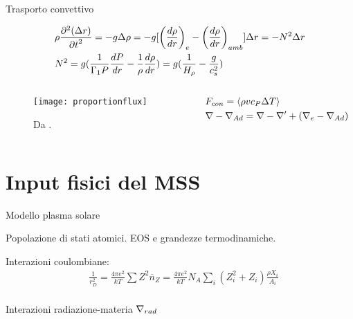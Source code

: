 \documentclass[10pt,xcolor={usenames},fleqn,mathserif,serif]{beamer}
\begin{document}
\begin{frame}{Trasporto convettivo}

\begin{align*}
&\rho\PtwoDy{t}{(\Delta r)}=-g\Delta\rho=-g[\Dcvar{\TDy{r}{\rho}}{e}-\Dcvar{\TDy{r}{\rho}}{amb}]\Delta r=-N^2\Delta r\\
&N^2=g(\frac{1}{\Gamma_1P}\TDy{r}{P}-\frac{1}{\rho}\TDy{r}{\rho})=g(\frac{1}{\densityscale{}}-\frac{g}{c_s^2})%
\end{align*}

\begin{columns}[t]

\begin{column}{0.6\textwidth}

\begin{figure}[!h]
    \texttt{[image: proportionflux]}
    \caption{Da \cite{christensen1997effects}.}
    \label{fluxproportion}
\end{figure}

\end{column}

\begin{column}{0.4\textwidth}

\begin{align*}
&F_{con}=\exv{\rho vc_P\Delta T}\\%
&\nabla-\nad=\nabla-\nabla'+(\nabla_e-\nad{})
\end{align*}


\end{column}

\end{columns}

\end{frame}


\section{Input fisici del MSS}

\begin{frame}{Modello plasma solare}

\begin{block}{Popolazione di stati atomici. EOS e grandezze termodinamiche.}

Interazioni coulombiane:
\begin{align*}
&\frac{1}{r_D^2}=\frac{4\pi e^2}{kT}\sum Z^2\overline{n}_Z=\frac{4\pi e^2}{kT}N_A\sum_{i}(Z_i^2+Z_i)\frac{\rho X_i}{A_i}\\
\end{align*}

\end{block}

\begin{block}{Interazioni radiazione-materia}
$\nabla_{rad}{}$
\end{block}

\end{frame}
\end{document}
